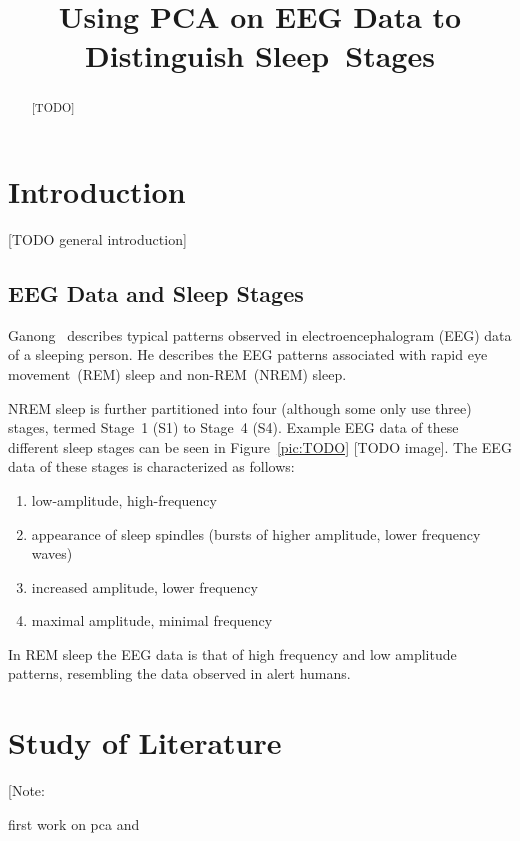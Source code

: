 \documentclass[a4paper]{IEEEtran}
\title{Using PCA on EEG Data to Distinguish Sleep~Stages}
\author{\IEEEauthorblockN{Ida Hönigmann}
	\IEEEauthorblockA{\\Technical University Vienna, Austria\\
		Email: e12002348@student.tuwien.ac.at}}
\begin{document}
\maketitle

\begin{abstract}
[TODO]
\end{abstract}

\section{Introduction}
\label{sec:introduction}

[TODO general introduction]

\subsection{EEG Data and Sleep Stages}

Ganong~\cite{Ganong1997} describes typical patterns observed in electroencephalogram (EEG) data of a sleeping person. He describes the EEG patterns associated with rapid eye movement~(REM) sleep and non-REM~(NREM) sleep.

NREM sleep is further partitioned into four (although some only use three) stages, termed Stage~1 (S1) to Stage~4 (S4). Example EEG data of these different sleep stages can be seen in Figure~\ref{pic:TODO} [TODO image]. The EEG data of these stages is characterized as follows:

\begin{enumerate}[label={S\arabic*:}]
\item low-amplitude, high-frequency
\item appearance of sleep spindles (bursts of higher amplitude, lower frequency waves)
\item increased amplitude, lower frequency
\item maximal amplitude, minimal frequency
\end{enumerate}

In REM sleep the EEG data is that of high frequency and low amplitude patterns, resembling the data observed in alert humans.

\section{Study of Literature}
\label{sec:study_of_literature}

[Note:

first work on pca \cite{Pearson1901} and \cite{Hotelling1933}
\end{document}
